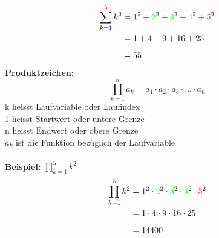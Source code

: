 \documentclass[a4paper,10pt]{article}
\begin{document}
\begin{multicols}{3}
    \begin{align*} \sum_{k={\color{blue}1}}^{{\color{red}5}} k^2 &= {\color{blue}1}^2 + {\color{green}2}^2 + {\color{green}3}^2 + {\color{green}4}^2 + {\color{red}5}^2 \\ &= 1 + 4 + 9 + 16 + 25 \\[5px] &= 55 \end{align*}
    \textbf{Produktzeichen:}
    \[ \prod_{k=1}^{n} a_k = a_1 \cdot a_2 \cdot a_3 \cdot \ldots \cdot a_n\]
    k heisst Laufvariable oder Laufindex \\
    1 heisst Startwert oder untere Grenze \\
    n heisst Endwert oder obere Grenze \\
    $a_{k}$ ist die Funktion bezüglich der Laufvariable \\~\\
    \textbf{Beispiel:}
    $\prod_{k=1}^{5} k^2$ \\
    \begin{align*} \prod_{k={\color{blue}1}}^{{\color{red}5}} k^2 &= {\color{blue}1}^2 \cdot {\color{green}2}^2 \cdot {\color{green}3}^2 \cdot {\color{green}4}^2 \cdot {\color{red}5}^2 \\ &= 1 \cdot 4 \cdot 9 \cdot 16 \cdot 25 \\[5px] &= 14400 \end{align*}


\end{multicols}
\end{document}
